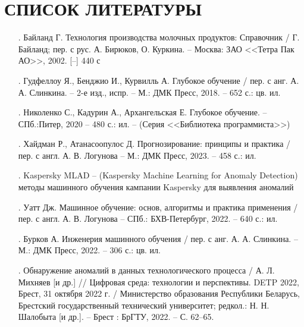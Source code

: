 \sectionbreak \section*{ 
    \gostTitleFont
    \redline
    СПИСОК ЛИТЕРАТУРЫ
}
\titlespace

{\gostFont

\begin{itemize}[leftmargin=2.15cm, labelwidth=0.65cm, labelsep=0.0cm] 

    \item[\theimagecntr.] Байланд Г. Технология производства молочных продуктов: Справочник / Г. Байланд; пер. с рус. А. Бирюков, О. Куркина. {--} Москва: ЗАО <<Тетра Пак АО>>, 2002. [--] 440 с
    \addtocounter{imagecntr}{1}

    \item[\theimagecntr.] Гудфеллоу Я., Бенджио И., Курвилль А. Глубокое обучение / пер. с анг. А. А. Слинкина. {--} 2-е изд., испр. {--} М.: ДМК Пресс, 2018. {--} 652 с.: цв. ил. 
    \addtocounter{imagecntr}{1}

    \item[\theimagecntr.] Николенко С., Кадурин А., Архангельская Е. Глубокое обучение. {--} СПб.:Питер, 2020 {--} 480 с.: ил. {--} (Серия <<Библиотека программиста>>)
    \addtocounter{imagecntr}{1}

    \item[\theimagecntr.] Хайдман Р., Атанасоопулос Д. Прогнозирование: принципы и практика / пер. с англ. А. В. Логунова {--} М.: ДМК Пресс, 2023. {--} 458 с.: ил. 
    \addtocounter{imagecntr}{1}

    \item[\theimagecntr.] Kaspersky MLAD {--} (Kaspersky Machine Learning for Anomaly Detection) методы машинного обучения кампании Kaspersky для выявления аномалий
    \addtocounter{imagecntr}{1}

    \item[\theimagecntr.] Уатт Дж. Машинное обучение: основ, алгоритмы и практика применения / пер. с англ. А. В. Логунова {--} СПб.: БХВ-Петербург, 2022. {--} 640 с.: ил. 
    \addtocounter{imagecntr}{1}

    \item[\theimagecntr.] Бурков А. Инженерия машинного обучения / пер. с анг. А. А. Слинкина. {--} М.: ДМК Пресс, 2022. {--} 306 с.: цв. ил.
    \addtocounter{imagecntr}{1}

    \item[\theimagecntr.] Обнаружение аномалий в данных технологического процесса / А. Л. Михняев [и др.] // Цифровая среда: технологии и перспективы. DETP 2022, Брест, 31 октября 2022 г. / Министерство образования Республики Беларусь, Брестский государственный технический университет; редкол.: Н. Н. Шалобыта [и др.]. {--} Брест : БрГТУ, 2022. {--} С. 62–65.
    \addtocounter{imagecntr}{1}


\end{itemize}}
